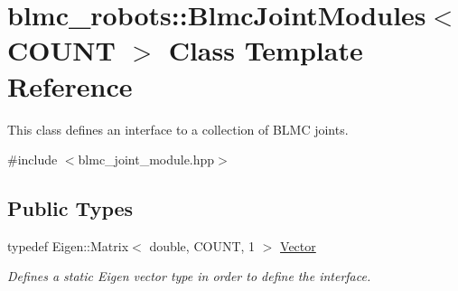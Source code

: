 \hypertarget{classblmc__robots_1_1BlmcJointModules}{}\section{blmc\+\_\+robots\+:\+:Blmc\+Joint\+Modules$<$ C\+O\+U\+NT $>$ Class Template Reference}
\label{classblmc__robots_1_1BlmcJointModules}


This class defines an interface to a collection of B\+L\+MC joints.  




{\ttfamily \#include $<$blmc\+\_\+joint\+\_\+module.\+hpp$>$}

\subsection*{Public Types}
\begin{DoxyCompactItemize}
\item 
\mbox{\label{classblmc__robots_1_1BlmcJointModules_abaff382c6fd4b494ec0c17498d94919e}} 
typedef Eigen\+::\+Matrix$<$ double, C\+O\+U\+NT, 1 $>$ \hyperlink{classblmc__robots_1_1BlmcJointModules_abaff382c6fd4b494ec0c17498d94919e}{Vector}
\begin{DoxyCompactList}\small\item\em Defines a static Eigen vector type in order to define the interface. \end{DoxyCompactList}\end{DoxyCompactItemize}
